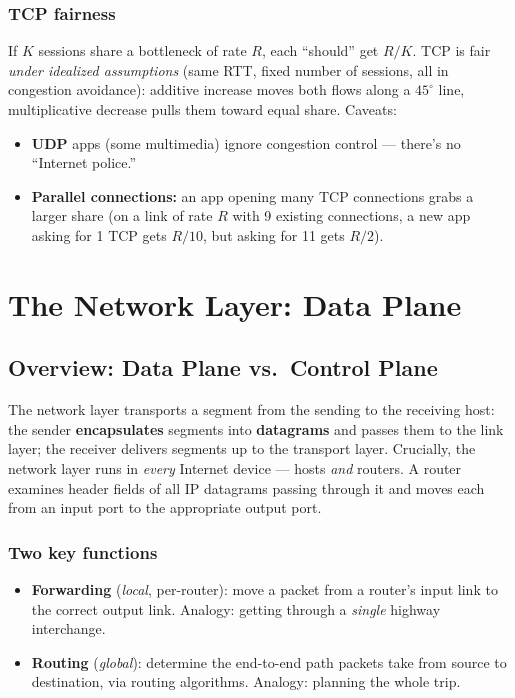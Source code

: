 \documentclass[hidelinks]{article}
\begin{document}
\subsubsection{TCP fairness}
If $K$ sessions share a bottleneck of rate $R$, each ``should'' get $R/K$.
TCP is fair \emph{under idealized assumptions} (same RTT, fixed number of
sessions, all in congestion avoidance): additive increase moves both flows
along a $45^\circ$ line, multiplicative decrease pulls them toward equal
share. Caveats:
\begin{itemize}
    \item \textbf{UDP} apps (some multimedia) ignore congestion control ---
    there's no ``Internet police.''
    \item \textbf{Parallel connections:} an app opening many TCP connections
    grabs a larger share (on a link of rate $R$ with 9 existing connections, a
    new app asking for 1 TCP gets $R/10$, but asking for 11 gets $R/2$).
\end{itemize}

\section{The Network Layer: Data Plane}

\subsection{Overview: Data Plane vs.\ Control Plane}

The network layer transports a segment from the sending to the receiving
host: the sender \textbf{encapsulates} segments into \textbf{datagrams} and
passes them to the link layer; the receiver delivers segments up to the
transport layer. Crucially, the network layer runs in \emph{every} Internet
device --- hosts \emph{and} routers. A router examines header fields of all
IP datagrams passing through it and moves each from an input port to the
appropriate output port.

\subsubsection{Two key functions}
\begin{itemize}
    \item \textbf{Forwarding} (\emph{local}, per-router): move a packet from a
    router's input link to the correct output link. Analogy: getting through
    a \emph{single} highway interchange.
    \item \textbf{Routing} (\emph{global}): determine the end-to-end path
    packets take from source to destination, via routing algorithms. Analogy:
    planning the whole trip.
\end{itemize}
\end{document}
